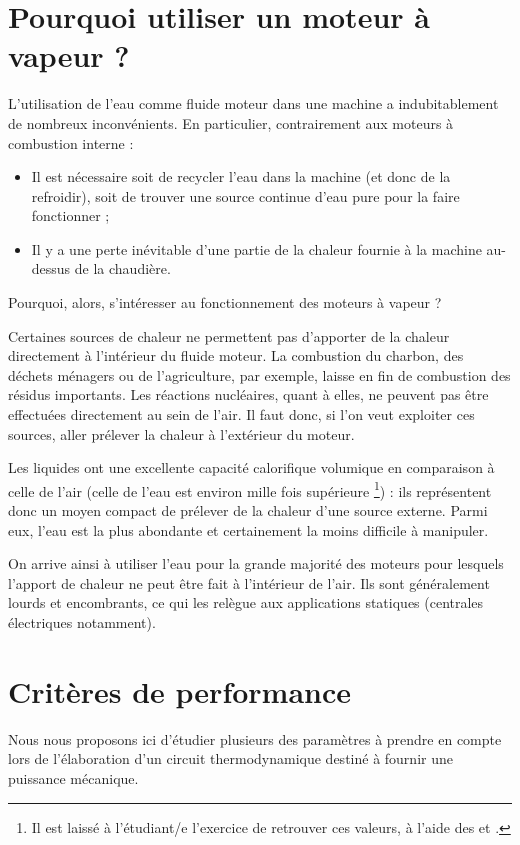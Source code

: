\section{Pourquoi utiliser un moteur à vapeur ?}

	L’utilisation de l’eau comme fluide moteur dans une machine a indubitablement de nombreux inconvénients. En particulier, contrairement aux moteurs à combustion interne :
	\begin{itemize}
		\item Il est nécessaire soit de recycler l’eau dans la machine (et donc de la refroidir), soit de trouver une source continue d’eau pure pour la faire fonctionner ;
		\item Il y a une perte inévitable d’une partie de la chaleur fournie à la machine au-dessus de la chaudière.
	\end{itemize}

	Pourquoi, alors, s’intéresser au fonctionnement des moteurs à vapeur ?

	Certaines sources de chaleur ne permettent pas d’apporter de la chaleur directement à l’intérieur du fluide moteur. La combustion du charbon, des déchets ménagers ou de l’agriculture, par exemple, laisse en fin de combustion des résidus importants. Les réactions nucléaires, quant à elles, ne peuvent pas être effectuées directement au sein de l’air. Il faut donc, si l’on veut exploiter ces sources, aller prélever la chaleur à l’extérieur du moteur.

	Les liquides ont une excellente capacité calorifique volumique en comparaison à celle de l’air (celle de l’eau est environ mille fois supérieure%
		\footnote{Il est laissé à l’étudiant/e l’exercice de retrouver ces valeurs, à l’aide des \coursquatre et \courscinq.}) : ils représentent donc un moyen compact de prélever de la chaleur d’une source externe. Parmi eux, l’eau est la plus abondante et certainement la moins difficile à manipuler. 

	On arrive ainsi à utiliser l’eau pour la grande majorité des moteurs pour lesquels l’apport de chaleur ne peut être fait à l’intérieur de l’air. Ils sont généralement lourds et encombrants, ce qui les relègue aux applications statiques (centrales électriques notamment).


\section{Critères de performance}

	Nous nous proposons ici d’étudier plusieurs des paramètres à prendre en compte lors de l’élaboration d’un circuit thermodynamique destiné à fournir une puissance mécanique.


